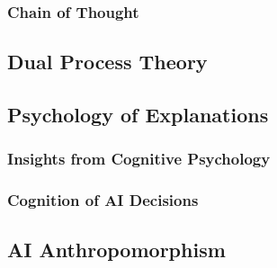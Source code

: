 \subsubsection{Chain of Thought} \label{sssec:chain_of_thought}

\subsection{Dual Process Theory} \label{ssec:dual_process_theory}

\subsection{Psychology of Explanations} \label{ssec:psychology_of_explanations}

\subsubsection{Insights from Cognitive Psychology} \label{sssec:insights_from_cognitive_psychology}

\subsubsection{Cognition of AI Decisions}

\cite{Jussupow2021}

\subsection{AI Anthropomorphism} \label{ssec:ai_antropomorphism}
